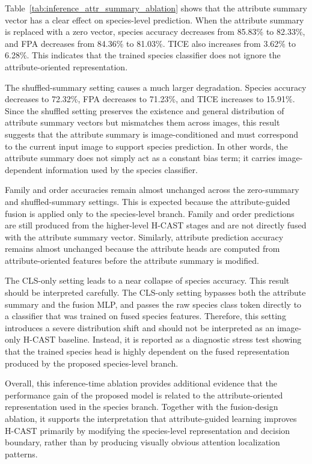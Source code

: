 Table~\ref{tab:inference_attr_summary_ablation} shows that the attribute summary vector has a clear effect on species-level prediction. When the attribute summary is replaced with a zero vector, species accuracy decreases from 85.83\% to 82.33\%, and FPA decreases from 84.36\% to 81.03\%. TICE also increases from 3.62\% to 6.28\%. This indicates that the trained species classifier does not ignore the attribute-oriented representation.

The shuffled-summary setting causes a much larger degradation. Species accuracy decreases to 72.32\%, FPA decreases to 71.23\%, and TICE increases to 15.91\%. Since the shuffled setting preserves the existence and general distribution of attribute summary vectors but mismatches them across images, this result suggests that the attribute summary is image-conditioned and must correspond to the current input image to support species prediction. In other words, the attribute summary does not simply act as a constant bias term; it carries image-dependent information used by the species classifier.

Family and order accuracies remain almost unchanged across the zero-summary and shuffled-summary settings. This is expected because the attribute-guided fusion is applied only to the species-level branch. Family and order predictions are still produced from the higher-level H-CAST stages and are not directly fused with the attribute summary vector. Similarly, attribute prediction accuracy remains almost unchanged because the attribute heads are computed from attribute-oriented features before the attribute summary is modified.

The CLS-only setting leads to a near collapse of species accuracy. This result should be interpreted carefully. The CLS-only setting bypasses both the attribute summary and the fusion MLP, and passes the raw species class token directly to a classifier that was trained on fused species features. Therefore, this setting introduces a severe distribution shift and should not be interpreted as an image-only H-CAST baseline. Instead, it is reported as a diagnostic stress test showing that the trained species head is highly dependent on the fused representation produced by the proposed species-level branch.

Overall, this inference-time ablation provides additional evidence that the performance gain of the proposed model is related to the attribute-oriented representation used in the species branch. Together with the fusion-design ablation, it supports the interpretation that attribute-guided learning improves H-CAST primarily by modifying the species-level representation and decision boundary, rather than by producing visually obvious attention localization patterns.





